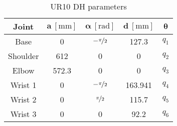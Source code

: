 \begin{table}
\centering
\caption{UR10 DH parameters}
\label{tab:ur10}
\begin{tabular}{|c|c|c|c|c|} 
\hline
\textbf{Joint} & $\bm a~[\si{\milli\meter}]$ & $\bm\alpha~[\si{\radian}]$ & $\bm d~[\si{\milli\meter}]$ & $\bm\theta$ \\ 
\hline
Base & 0 & $-\nicefrac{\pi}{2}$ & 127.3 & $q_1$ \\
Shoulder & 612 & 0 & 0 & $q_2$ \\
Elbow & 572.3 & 0 & 0 & $q_3$ \\
Wrist 1 & 0 & $-\nicefrac{\pi}{2}$ & 163.941 & $q_4$ \\
Wrist 2 & 0 & $\nicefrac{\pi}{2}$ & 115.7 & $q_5$ \\
Wrist 3 & 0 & 0 & 92.2 & $q_6$ \\
\hline
\end{tabular}
\end{table}